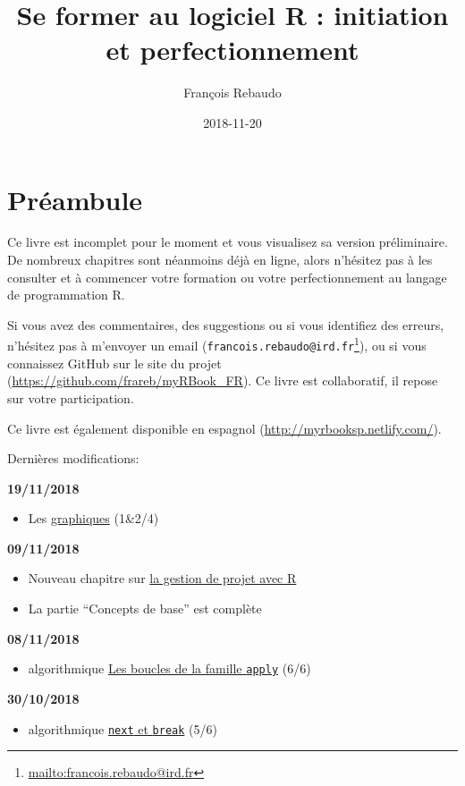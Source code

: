 \documentclass[]{book}
\title{Se former au logiciel R : initiation et perfectionnement}
\author{François Rebaudo}
\date{2018-11-20}
\providecommand{\tightlist}{%
  \setlength{\itemsep}{0pt}\setlength{\parskip}{0pt}}
\let\rmarkdownfootnote\footnote%
\def\footnote{\protect\rmarkdownfootnote}
\renewcommand{\href}[2]{#2\footnote{\url{#1}}}
\theoremstyle{definition}
\theoremstyle{definition}
\theoremstyle{definition}
\theoremstyle{remark}
\begin{document}
\maketitle

{
\setcounter{tocdepth}{1}
\tableofcontents
}
\chapter{Préambule}\label{preambule}

Ce livre est incomplet pour le moment et vous visualisez sa version
préliminaire. De nombreux chapitres sont néanmoins déjà en ligne, alors
n'hésitez pas à les consulter et à commencer votre formation ou votre
perfectionnement au langage de programmation R.

Si vous avez des commentaires, des suggestions ou si vous identifiez des
erreurs, n'hésitez pas à m'envoyer un email
(\href{mailto:francois.rebaudo@ird.fr}{\nolinkurl{francois.rebaudo@ird.fr}}),
ou si vous connaissez GitHub sur le site du projet
(\url{https://github.com/frareb/myRBook_FR}). Ce livre est collaboratif,
il repose sur votre participation.

Ce livre est également disponible en espagnol
(\url{http://myrbooksp.netlify.com/}).

Dernières modifications:

\textbf{19/11/2018}

\begin{itemize}
\tightlist
\item
  Les \protect\hyperlink{graph1}{graphiques} (1\&2/4)
\end{itemize}

\textbf{09/11/2018}

\begin{itemize}
\tightlist
\item
  Nouveau chapitre sur \protect\hyperlink{project}{la gestion de projet
  avec R}
\item
  La partie ``Concepts de base'' est complète
\end{itemize}

\textbf{08/11/2018}

\begin{itemize}
\tightlist
\item
  algorithmique \protect\hyperlink{l17applyfamily}{Les boucles de la
  famille \texttt{apply}} (6/6)
\end{itemize}

\textbf{30/10/2018}

\begin{itemize}
\tightlist
\item
  algorithmique \protect\hyperlink{l17spe}{\texttt{next} et
  \texttt{break}} (5/6)
\end{itemize}
\end{document}

